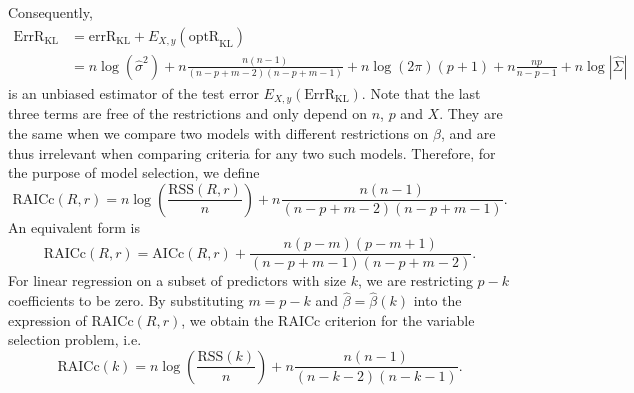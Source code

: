 Consequently, 
\begin{equation*}
\begin{aligned}
\widehat{\text{ErrR}}_\text{KL} &= \text{errR}_\text{KL} + E_{X,y} (\text{optR}_\text{KL}) \\
&=n\log \left(\hat\sigma^2\right) + n \frac{n(n-1)}{(n-p+m-2)(n-p+m-1)} + n\log(2\pi)(p+1) + n\frac{np}{n-p-1} + n\log|\hat\Sigma|
\end{aligned}
\end{equation*}
is an unbiased estimator of the test error $E_{X,y}(\text{ErrR}_\text{KL})$. Note that the last three terms are free of the restrictions and only depend on $n$, $p$ and $X$. They are the same when we compare two models with different restrictions on $\beta$, and are thus irrelevant when comparing criteria for any two such models. Therefore, for the purpose of model selection, we define
\begin{equation*}
\text{RAICc}(R,r) = n\log \left(\frac{\text{RSS}(R,r)}{n}\right) + n \frac{n(n-1)}{(n-p+m-2)(n-p+m-1)}.
\end{equation*}
An equivalent form is
\begin{equation*}
\text{RAICc}(R,r) = \text{AICc}(R,r) + \frac{n(p-m)(p-m+1)}{(n-p+m-1)(n-p+m-2)}.
\end{equation*} 
For linear regression on a subset of predictors with size $k$, we are restricting $p-k$ coefficients to be zero. By substituting $m=p-k$ and $\hat\beta = \hat\beta(k)$ into the expression of $\text{RAICc}(R,r)$, we obtain the RAICc criterion for the variable selection problem, i.e.
\begin{equation*}
\text{RAICc}(k) = n\log \left(\frac{\text{RSS}(k)}{n}\right) + n \frac{n(n-1)}{(n-k-2)(n-k-1)}.
\end{equation*}

